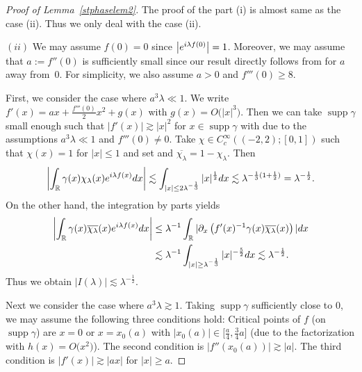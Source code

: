 \documentclass[10pt,a4paper]{article}
\numberwithin{equation}{section}
\def\R{\mathbb{R}}%
\DeclareMathOperator{\supp}{supp}%
\def\c{\gamma}
\def\l{\lambda}
\def\pa{\partial}
\begin{document}
\begin{proof}[Proof of Lemma~\ref{stphaselem2}]
The proof of the part (i) is almost same as the case (ii). Thus we only deal with the case (ii).

$(ii)$ We may assume $f(0)=0$ since $\big|{\rm e}^{{\rm i}\l f(0)}\big|=1$. Moreover, we may assume that $a:=f''(0)$ is sufficiently small since our result directly follows from \cite[p.334, Corollary]{S} for $a$ away from~$0$. For simplicity, we also assume $a>0$ and $f'''(0)\geq 8$.


First, we consider the case where $a^3\l\ll 1$. We write $f'(x)=ax+\frac{f'''(0)}{2}x^2+g(x)$ with ${g(x)=O\bigl(|x|^3\bigr)}$. Then we can take $\supp \c$ small enough such that $|f'(x)|\gtrsim |x|^2$ for $x\in \supp \c$ with \smash{$|x|\geq \l^{-\frac{1}{3}}$} due to the assumptions $a^3\l\ll 1$ and $f'''(0)\neq 0$.
Take $\chi\in C_c^{\infty}((-2,2);[0,1])$ such that $\chi(x)=1$ for $|x|\leq 1$ and set \smash{$\chi_{\l}(x)=\chi\bigl(\l^{\frac{1}{3}}xv)$} and $\overline{\chi_{\l}}=1-\chi_{\l}$. Then
\[
\left|\int_{\R}\c(x)\chi_{\l}(x){\rm e}^{{\rm i}\l f(x)}{\rm d}x\right|\lesssim \int_{|x|\leq 2\l^{-\frac{1}{3}}}|x|^{\frac{1}{2}} {\rm d}x\lesssim \l^{-\frac{1}{3}(1+\frac{1}{2})}=\l^{-\frac{1}{2}}.
\]
 On the other hand, the integration by parts yields
\begin{align*}
\left|\int_{\R}\c(x)\overline{\chi_{\l}}(x){\rm e}^{{\rm i}\l f(x)}{\rm d}x\right|&\leq \l^{-1}\int_{\R}|\pa_x\left(f'(x)^{-1}\c(x)\overline{\chi_{\l}}(x) \right)|{\rm d}x\\
&\lesssim \l^{-1}\int_{|x|\geq \l^{-\frac{1}{3}}}|x|^{-\frac{5}{2}}{\rm d}x\lesssim \l^{-\frac{1}{2}}.
\end{align*}
Thus we obtain $|I(\l)|\lesssim \l^{-\frac{1}{2}}$.

Next we consider the case where $a^3\l\gtrsim 1$. Taking $\supp \c$ sufficiently close to $0$, we may assume the following three conditions hold: Critical points of $f$ (on $\supp \c$) are $x=0$ or $x=x_0(a)$ with ${|x_0(a)|\in \bigl[\frac{a}{4}, \frac{3}{4}a\bigr]}$ \big(due to the factorization  with $h(x)=O\bigl(x^2\bigr)$\big). The second condition is $|f''(x_0(a))|\gtrsim |a|$. The third condition is $|f'(x)|\gtrsim |ax|$ for $|x|\geq a$.


\end{proof}
\end{document}
